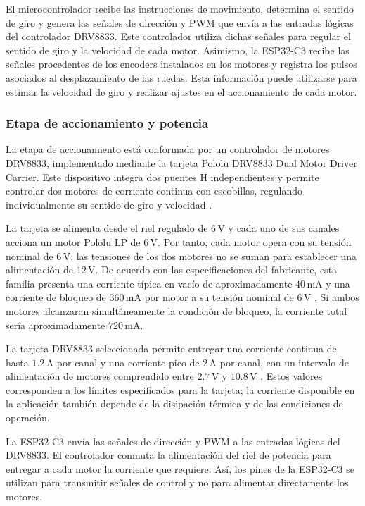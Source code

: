 \documentclass[11pt]{article}
\begin{document}
El microcontrolador recibe las instrucciones de movimiento, determina el
sentido de giro y genera las señales de dirección y PWM que envía a las
entradas lógicas del controlador DRV8833. Este controlador utiliza dichas
señales para regular el sentido de giro y la velocidad de cada motor. Asimismo,
la ESP32-C3 recibe las señales procedentes de los encoders instalados en los
motores y registra los pulsos asociados al desplazamiento de las ruedas. Esta
información puede utilizarse para estimar la velocidad de giro y realizar
ajustes en el accionamiento de cada motor.

\subsubsection{Etapa de accionamiento y potencia}

La etapa de accionamiento está conformada por un controlador de motores
DRV8833, implementado mediante la tarjeta Pololu DRV8833 Dual Motor Driver
Carrier. Este dispositivo integra dos puentes H independientes y permite
controlar dos motores de corriente continua con escobillas, regulando
individualmente su sentido de giro y velocidad \cite{pololu_drv8833,ti_drv8833}.

La tarjeta se alimenta desde el riel regulado de \(6\,\mathrm{V}\) y cada uno
de sus canales acciona un motor Pololu LP de \(6\,\mathrm{V}\). Por tanto, cada
motor opera con su tensión nominal de \(6\,\mathrm{V}\); las tensiones de los
dos motores no se suman para establecer una alimentación de \(12\,\mathrm{V}\).
De acuerdo con las especificaciones del fabricante, esta familia presenta una
corriente típica en vacío de aproximadamente \(40\,\mathrm{mA}\) y una corriente
de bloqueo de \(360\,\mathrm{mA}\) por motor a su tensión nominal de
\(6\,\mathrm{V}\) \cite{pololu_lp_6v}. Si ambos motores alcanzaran
simultáneamente la condición de bloqueo, la corriente total sería
aproximadamente \(720\,\mathrm{mA}\).

La tarjeta DRV8833 seleccionada permite entregar una corriente continua de
hasta \(1.2\,\mathrm{A}\) por canal y una corriente pico de \(2\,\mathrm{A}\)
por canal, con un intervalo de alimentación de motores comprendido entre
\(2.7\,\mathrm{V}\) y \(10.8\,\mathrm{V}\) \cite{pololu_drv8833}. Estos valores
corresponden a los límites especificados para la tarjeta; la corriente
disponible en la aplicación también depende de la disipación térmica y de las
condiciones de operación.

La ESP32-C3 envía las señales de dirección y PWM a las entradas lógicas del
DRV8833. El controlador conmuta la alimentación del riel de potencia para
entregar a cada motor la corriente que requiere. Así, los pines de la
ESP32-C3 se utilizan para transmitir señales de control y no para alimentar
directamente los motores.
\end{document}
